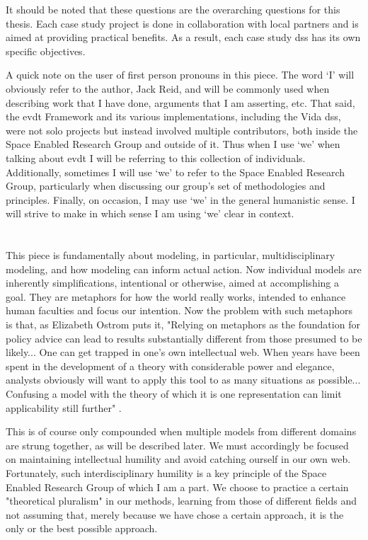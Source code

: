 It should be noted that these questions are the overarching questions for this thesis. Each case study project is done in collaboration with local partners and is aimed at providing practical benefits. As a result, each case study \ac{dss} has its own specific objectives.

A quick note on the user of first person pronouns in this piece. The word `I' will obviously refer to the author, Jack Reid, and will be commonly used when describing work that I have done, arguments that I am asserting, etc. That said, the \ac{evdt} Framework and its various implementations, including the Vida \ac{dss}, were not solo projects but instead involved multiple contributors, both inside the Space Enabled Research Group and outside of it. Thus when I use `we' when talking about \ac{evdt} I will be referring to this collection of individuals. Additionally, sometimes I will use `we' to refer to the Space Enabled Research Group, particularly when discussing our group's set of methodologies and principles. Finally, on occasion, I may use `we' in the general humanistic sense. I will strive to make in which sense I am using `we' clear in context.

\section{}

This piece is fundamentally about modeling, in particular, multidisciplinary modeling, and how modeling can inform actual action. Now individual models are inherently simplifications, intentional or otherwise, aimed at accomplishing a goal. They are metaphors for how the world really works, intended to enhance human faculties and focus our intention. Now the problem with such metaphors is that, as Elizabeth Ostrom puts it, "Relying on metaphors as the foundation for policy advice can lead to results substantially different from those presumed to be likely... One can get trapped in one's own intellectual web. When years have been spent in the development of a theory with considerable power and elegance, analysts obviously will want to apply this tool to as many situations as possible... Confusing a model with the theory of which it is one representation can limit applicability still further" \cite{ostromGoverningCommonsEvolution2015}. 

This is of course only compounded when multiple models from different domains are strung together, as will be described later. We must accordingly be focused on maintaining intellectual humility and avoid catching ourself in our own web. Fortunately, such interdisciplinary humility is a key principle of the Space Enabled Research Group of which I am a part. We choose to practice a certain "theoretical pluralism" \cite{turkleEmpathyDiariesMemoir2021} in our methods, learning from those of different fields and not assuming that, merely because we have chose a certain approach, it is the only or the best possible approach.

